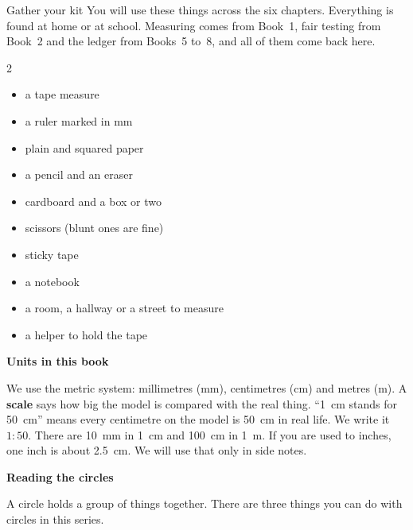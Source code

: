 \begin{tryit}{Gather your kit}
You will use these things across the six chapters. Everything is found at home or at school. Measuring comes from Book~1, fair testing from Book~2 and the ledger from Books~5 to~8, and all of them come back here.
\begin{multicols}{2}
\begin{itemize}[leftmargin=1.2em]
\item a tape measure
\item a ruler marked in mm
\item plain and squared paper
\item a pencil and an eraser
\item cardboard and a box or two
\item scissors (blunt ones are fine)
\item sticky tape
\item a notebook
\item a room, a hallway or a street to measure
\item a helper to hold the tape
\end{itemize}
\end{multicols}
\end{tryit}

{\sans\bfseries\large\color{sky!70!black} Units in this book}\par
We use the metric system: millimetres (mm), centimetres (cm) and metres (m). A \textbf{scale} says how big the model is compared with the real thing. ``1~cm stands for 50~cm'' means every centimetre on the model is 50~cm in real life. We write it $1:50$.
There are 10~mm in 1~cm and 100~cm in 1~m. If you are used to inches, one inch is about 2.5~cm. We will use that only in side notes.
\clearpage

\thispagestyle{plain}\label{circlecard}
{\sans\bfseries\LARGE\color{ink} Reading the circles}\par\vspace{0.1cm}
A circle holds a group of things together. There are three things you can do with circles in this series.

